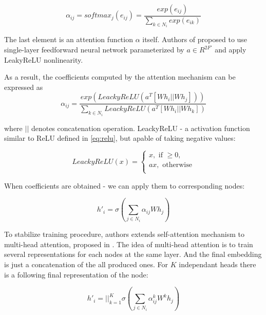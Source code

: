\begin{equation}
   \alpha_{ij} = softmax_j(e_{ij}) = \frac{exp(e_{ij})}{\sum_{k \in N_i}exp(e_{ik})}
\end{equation}

The last element is an attention function $\alpha$ itself. Authors of \cite{GAT} proposed to use
single-layer feedforward neural network parameterized by $a \in R^{2F'}$ and apply LeakyReLU nonlinearity.

As a result, the coefficients computed by the attention mechanism can be expressed as
\begin{equation}
    \alpha_{ij} = \frac{exp(LeackyReLU(a^{T}[Wh_i || Wh_j]))}{\sum_{k \in N_i}LeackyReLU(a^{T}[Wh_i || Wh_k])}
    \label{eq:final_att_coef}
 \end{equation}

where $||$ denotes concatenation operation. LeackyReLU - a activation function similar to ReLU defined in \ref{eq:relu}, but
apable of taking negative values:

\begin{equation}
    LeackyReLU(x) = 
    \begin{cases}
        x, \text{ if } \geq 0, \\
        ax, \text{ otherwise} \\
    \end{cases}
    \label{eq:leacky_relu}
\end{equation}

When coefficients are obtained - we can apply them to corresponding nodes:

\begin{equation}
    h'_i = \sigma \left( \sum_{j \in {N_i}} \alpha_{ij} W h_j \right)
    \label{eq:final_att}
 \end{equation}

To stabilize training procedure, authors extends self-attention mechanism
to multi-head attention, proposed in \cite{AttentionIsAllYouNeed}.
The idea of multi-head attention is to train several representations for each nodes at the same layer. And the final embedding
is just a concatenation of the all produced ones. For $K$ independant heads  there is a following final representation of the node:

\begin{equation}
    h'_i = ||_{k=1}^{K}  \sigma \left( \sum_{j \in {N_i}} \alpha^{k}_{ij} W^{k} h_j \right)
    \label{eq:multihead}
\end{equation}

